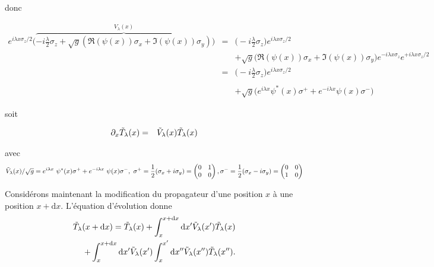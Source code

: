 \documentclass[submission,Phys,10pt]{SciPost}%
\begin{document}
{{donc 

\begin{eqnarray*}
	e^{ i \lambda x \sigma_z/2  } \Big(\overbrace{- i \frac{\lambda}2 \sigma_z  + \sqrt{g} ( \Re(\psi(x))\sigma_x + \Im( \psi(x))  \sigma_y )}^{V_\lambda ( x) } \Big) & = & 	\Big( - i \frac{\lambda}2 \sigma_z \Big )  e^{ i \lambda x \sigma_z/2  } \\
	&&  + \sqrt{g} \Big ( \Re(\psi(x))\sigma_x + \Im( \psi(x))  \sigma_y \Big ) e^{ - i \lambda x \sigma_z  }e^{ + i \lambda x \sigma_z/2   }	\\
	& =&  \Big ( - i \frac{\lambda}2 \sigma_z \Big )  e^{ i \lambda x \sigma_z /2  } \\ \\
	&& + \sqrt{g} \Big ( e^{ i \lambda x  } \psi^\ast(x) \sigma^+ + e^{ - i \lambda x } \psi(x) \sigma^- \Big ) 
\end{eqnarray*}

soit 

\begin{eqnarray*}
	\partial_{x}\Tilde{T}_{\lambda}(x) & = &{\Tilde{V}_{\lambda}(x)}\Tilde{T}_{\lambda}(x)
\end{eqnarray*}

avec 
\begin{eqnarray*}
\Tilde{V}_{\lambda}(x)/\sqrt{g}= e^{i\lambda x} \psi^\ast(x) \sigma^+  +  e^{-i\lambda x} \psi(x) \sigma^- , ~ \sigma^+ = \frac{1}2 ( \sigma_x + i \sigma_y )  = \begin{pmatrix}
    0 & 1\\
    0 & 0
    \end{pmatrix},
    \sigma^- = \frac{1}2 ( \sigma_x - i \sigma_y )  = \begin{pmatrix}
    0 & 0\\
    1 & 0
    \end{pmatrix}
    \end{eqnarray*}
}

Considérons maintenant la modification du propagateur d'une position $x$ à une position $x+\mathrm{d}x$. L'équation d'évolution donne 
\begin{equation}
\begin{split}
        \Tilde{T}_{\lambda}(x+\mathrm{d}x)=\Tilde{T}_{\lambda}(x)+\int_{x}^{x+\mathrm{d}x}\mathrm{d}x' \Tilde{V}_{\lambda}(x')\Tilde{T}_{\lambda}(x)
        \\+\int_{x}^{x+\mathrm{d}x}\mathrm{d}x' \Tilde{V}_{\lambda}(x')\int_{x}^{x'}\mathrm{d}x'' \Tilde{V}_{\lambda}(x'')\Tilde{T}_{\lambda}(x'').
        \end{split}
        \label{eq:Txdx}
\end{equation}

}
\end{document}
